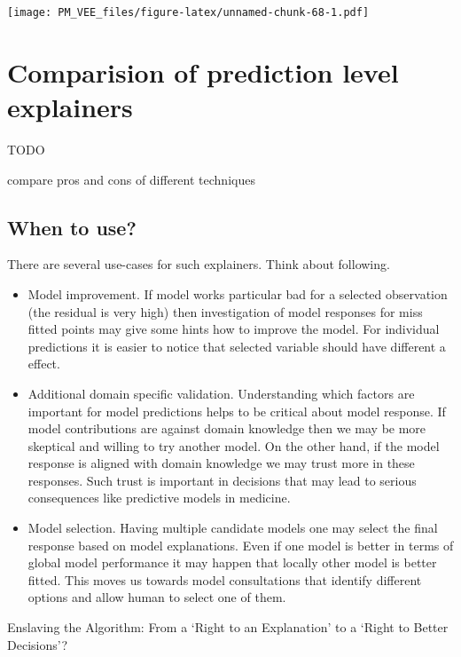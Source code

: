 \documentclass[12pt,]{krantz}
\providecommand{\tightlist}{%
  \setlength{\itemsep}{0pt}\setlength{\parskip}{0pt}}
\theoremstyle{definition}
\theoremstyle{definition}
\theoremstyle{definition}
\theoremstyle{remark}
\begin{document}
\texttt{[image: PM\_VEE\_files/figure-latex/unnamed-chunk-68-1.pdf]}

\hypertarget{comparision-of-prediction-level-explainers}{%
\section{Comparision of prediction level
explainers}\label{comparision-of-prediction-level-explainers}}

TODO

compare pros and cons of different techniques

\hypertarget{when-to-use}{%
\subsection{When to use?}\label{when-to-use}}

There are several use-cases for such explainers. Think about following.

\begin{itemize}
\tightlist
\item
  Model improvement. If model works particular bad for a selected
  observation (the residual is very high) then investigation of model
  responses for miss fitted points may give some hints how to improve
  the model. For individual predictions it is easier to notice that
  selected variable should have different a effect.
\item
  Additional domain specific validation. Understanding which factors are
  important for model predictions helps to be critical about model
  response. If model contributions are against domain knowledge then we
  may be more skeptical and willing to try another model. On the other
  hand, if the model response is aligned with domain knowledge we may
  trust more in these responses. Such trust is important in decisions
  that may lead to serious consequences like predictive models in
  medicine.
\item
  Model selection. Having multiple candidate models one may select the
  final response based on model explanations. Even if one model is
  better in terms of global model performance it may happen that locally
  other model is better fitted. This moves us towards model
  consultations that identify different options and allow human to
  select one of them.
\end{itemize}

Enslaving the Algorithm: From a `Right to an Explanation' to a `Right to
Better Decisions'? \citep{Edwards_Veale_2018}
\end{document}
